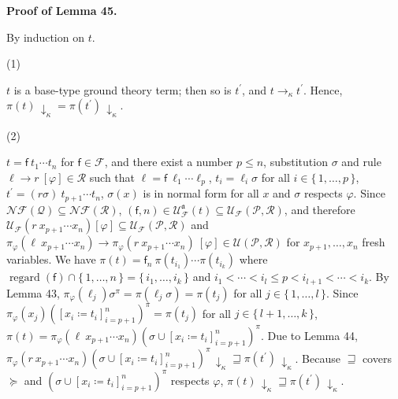\documentclass[10pt,a4paper]{amsart}
\providecommand{\coloneq}{\coloneqq}
\begin{document}
 
 
 
 
\par\medskip\noindent\textbf{Proof of Lemma 45.}\par
 
 
By induction on $t$.\par
  
\par\noindent  (1) 
 
$t$ is a base-type ground theory term; then so is $t^{\prime}$, and $t\rightarrow_{\kappa}t^{\prime}$. Hence, $\pi(t)\,{\downarrow}_{\kappa}=\pi(t^{\prime})\,{\downarrow}_{\kappa}$.\par
 
 
 
\par\noindent  (2) 
 
$t={\mathsf{f}}\ {{t}_{1}\cdots{t}_{n}}$ for $\mathsf{f}\in\mathcal{F}$, and there exist a number $p\leq n$, substitution $\sigma$ and rule ${\ell}\rightarrow{r}\ [\varphi]\in\mathcal{R}$ such that $\ell={\mathsf{f}}\ {{\ell}_{1}\cdots{\ell}_{p}}$, $t_{i}=\ell_{i}\sigma$ for all $i\in\{\,1,\ldots,p\,\}$, $t^{\prime}={(r\sigma)}\ {{t}_{p+1}\cdots{t}_{n}}$, $\sigma(x)$ is in normal form for all $x$ and $\sigma$ respects $\varphi$. Since $\mathcal{N}\!\mathcal{F}(\mathcal{Q})\subseteq\mathcal{N}\!\mathcal{F}(\mathcal{R})$, $(\mathsf{f},n)\in\mathcal{U}_{\mathcal{F}}^{\mathfrak{a}}(t)\subseteq\mathcal{U}_{\mathcal{F}}(\mathcal{P},\mathcal{R})$, and therefore $\mathcal{U}_{\mathcal{F}}({r}\ {{x}_{p+1}\cdots{x}_{n}})[\varphi]\subseteq\mathcal{U}_{\mathcal{F}}(\mathcal{P},\mathcal{R})$ and ${\pi_{\varphi}({\ell}\ {{x}_{p+1}\cdots{x}_{n}})}\rightarrow{\pi_{\varphi}({r}\ {{x}_{p+1}\cdots{x}_{n}})}\ [\varphi]\in\mathcal{U}(\mathcal{P},\mathcal{R})$ for ${x}_{p+1},\ldots,{x}_{n}$ fresh variables. We have $\pi(t)={\mathsf{f}_{n}}\ {\pi(t_{i_{1}})\cdots\pi(t_{i_{k}})}$ where $\operatorname{regard}(\mathsf{f})\cap\{\,1,\ldots,n\,\}=\{\,{i}_{1},\ldots,{i}_{k}\,\}$ and ${i}_{1}<\cdots<{i}_{l}\leq p<{i}_{l+1}<\cdots<{i}_{k}$. By Lemma 43, $\pi_{\varphi}(\ell_{j})\sigma^{\pi}=\pi(\ell_{j}\sigma)=\pi(t_{j})$ for all $j\in\{\,1,\ldots,l\,\}$. Since $\pi_{\varphi}(x_{j})([{x_{i}}\coloneq{t_{i}}]_{i=p+1}^{n})^{\pi}=\pi(t_{j})$ for all $j\in\{\,l+1,\ldots,k\,\}$, $\pi(t)=\pi_{\varphi}({\ell}\ {{x}_{p+1}\cdots{x}_{n}})(\sigma\cup[{x_{i}}\coloneq{t_{i}}]_{i=p+1}^{n})^{\pi}$. Due to Lemma 44, $\pi_{\varphi}({r}\ {{x}_{p+1}\cdots{x}_{n}})(\sigma\cup[{x_{i}}\coloneq{t_{i}}]_{i=p+1}^{n})^{\pi}\,{\downarrow}_{\kappa}\sqsupseteq\pi(t^{\prime})\,{\downarrow}_{\kappa}$. Because $\sqsupseteq$ covers $\succeq$ and $(\sigma\cup[{x_{i}}\coloneq{t_{i}}]_{i=p+1}^{n})^{\pi}$ respects $\varphi$, $\pi(t)\,{\downarrow}_{\kappa}\sqsupseteq\pi(t^{\prime})\,{\downarrow}_{\kappa}$.\par
 
\end{document}
